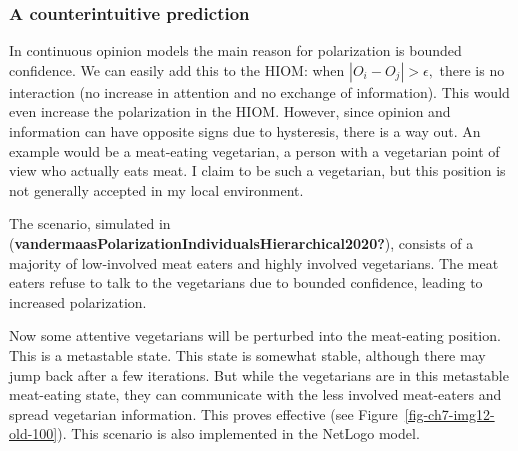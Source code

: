 \documentclass[
  letterpaper,
]{scrbook}
\begin{document}
\hypertarget{a-counterintuitive-prediction}{%
\subsubsection{A counterintuitive
prediction}\label{a-counterintuitive-prediction}}

In continuous opinion models the main reason for polarization is bounded
confidence. We can easily add this to the HIOM: when
\(\left| O_{i} - O_{j} \right| > \epsilon,\) there is no interaction (no
increase in attention and no exchange of information). This would even
increase the polarization in the HIOM. However, since opinion and
information can have opposite signs due to hysteresis, there is a way
out. An example would be a meat-eating vegetarian, a person with a
vegetarian point of view who actually eats meat. I claim to be such a
vegetarian, but this position is not generally accepted in my local
environment.

The scenario, simulated in
(\textbf{vandermaasPolarizationIndividualsHierarchical2020?}), consists
of a majority of low-involved meat eaters and highly involved
vegetarians. The meat eaters refuse to talk to the vegetarians due to
bounded confidence, leading to increased polarization.

Now some attentive vegetarians will be perturbed into the meat-eating
position. This is a metastable state. This state is somewhat stable,
although there may jump back after a few iterations. But while the
vegetarians are in this metastable meat-eating state, they can
communicate with the less involved meat-eaters and spread vegetarian
information. This proves effective (see
Figure~\ref{fig-ch7-img12-old-100}). This scenario is also implemented
in the NetLogo model.
\end{document}
